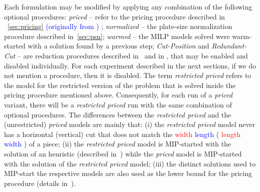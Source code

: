 \documentclass[ppgc,tese,english,formais,babel]{iiufrgs}
\newif\iffinalversion
\newcommand{\newtext}[1]{\iffinalversion%
#1%
\else%
\textcolor{blue}{#1}%
\fi%
}
\newcommand{\oldtext}[1]{\iffinalversion%
\else%
\textcolor{red}{#1}%
\fi%
}
\begin{document}
Each formulation may be modified by applying any combination of the following optional procedures:
\emph{priced} -- refer to the pricing procedure described in\newtext{~\cref{sec:pricing} (originally from \citet{dimitri_thesis})}\oldtext{\citet{dimitri_thesis}};
\emph{normalized} -- the plate-size normalization procedure described in~\cref{sec:psn};
\emph{warmed} -- the MILP models solved were warm-started with a solution found by a previous step;
\emph{Cut-Position} and \emph{Redundant-Cut} -- are reduction procedures described in~\citet{furini:2016} and in \citet{dimitri_thesis}, that may be enabled and disabled individually.
For each experiment described in the next sections, if we do not mention a procedure, then it is disabled.
The term \emph{restricted priced} refers to the model for the restricted version of the problem that is solved inside the pricing procedure mentioned above.
Consequently, for each run of a \emph{priced} variant, there will be a \emph{restricted priced} run with the same combination of optional procedures.
The differences between the \emph{restricted priced} and the (unrestricted) \emph{priced} models are mainly that:
(i) the \emph{restricted priced} model never has a horizontal (vertical) cut that does not match the \oldtext{width}\newtext{length} (\oldtext{length}\newtext{width}) of a piece;
(ii) the \emph{restricted priced} model is MIP-started with the solution of an heuristic (described in~\citet{dimitri_thesis}) while the \emph{priced} model is MIP-started with the solution of the \emph{restricted priced} model;
(iii) the distinct solutions used to MIP-start the respective models are also used as the lower bound for the pricing procedure (details in~\citet{dimitri_thesis}).
\end{document}
